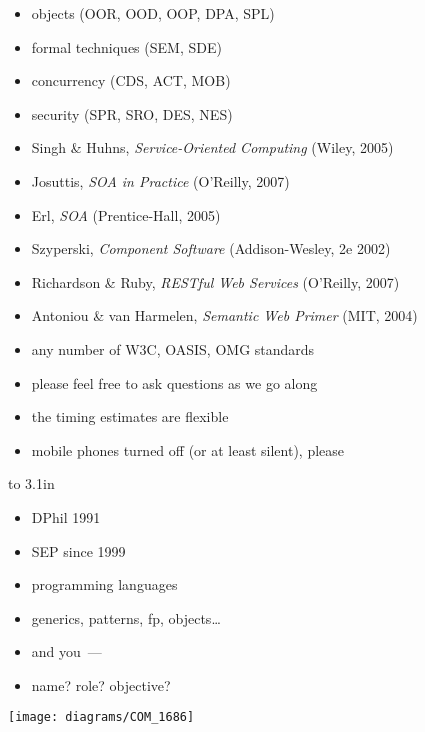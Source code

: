 \documentclass{sepslide-soa-faked} %
\begin{document}
\begin{slide}
\begin{itemize}
\item objects (OOR, OOD, OOP, DPA, SPL)
\item formal techniques (SEM, SDE)
\item concurrency (CDS, ACT, MOB)
\item security (SPR, SRO, DES, NES)
\end{itemize}
\end{slide}

\begin{slide}
\begin{itemize}
\item Singh \& Huhns, \textit{Service-Oriented Computing} 
  (Wiley, 2005)
\item Josuttis, \textit{SOA in Practice} 
  (O'Reilly, 2007)
\item Erl, \textit{SOA} 
  (Prentice-Hall, 2005)
\item Szyperski, \textit{Component Software} 
  (Addison-Wesley, 2e 2002)
\item Richardson \& Ruby, \textit{RESTful Web Services} 
  (O'Reilly, 2007)
\item Antoniou \& van Harmelen, \textit{Semantic Web Primer} 
  (MIT, 2004)
\item any number of W3C, OASIS, OMG standards
\end{itemize}
\end{slide}

\begin{slide}
\begin{itemize}
\item please feel free to ask questions as we go along
\item the timing estimates are flexible
\item mobile phones turned off (or at least silent), please
\end{itemize}
\end{slide}

\begin{slide}
\begin{minipage}{0.5\textwidth}\raggedright
\vbox to 3.1in{
\begin{itemize}
\item DPhil 1991
\item SEP since 1999
\item programming languages
\item generics, patterns, fp, objects\ldots
\bigskip
\item and you~---
\item name? role? objective?
\end{itemize}\vfil}
\end{minipage}
\hfil
\begin{minipage}{0.4\textwidth}\begin{flushright}%
\texttt{[image: diagrams/COM\_1686]}%
\end{flushright}\end{minipage}%
\end{slide}

\begin{slide}
  \Listofslides
\end{slide}

\begin{slide}
  \Timetable
\end{slide}
\end{document}
